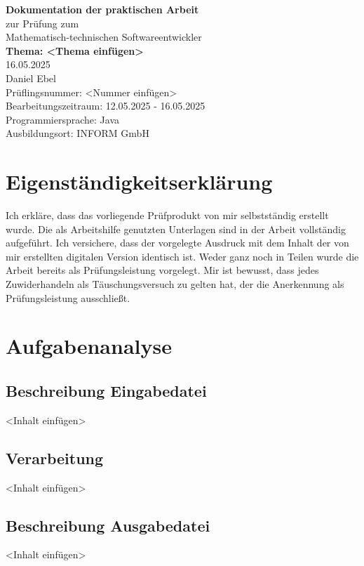 \documentclass[a4paper,12pt]{report}
\begin{document}
\begin{titlepage}
    \centering
    \vspace*{3cm}
    {\Huge \textbf{Dokumentation der praktischen Arbeit}}\\[2cm]
    {\large zur Prüfung zum \\ Mathematisch-technischen Softwareentwickler}\\[2cm]
    {\Large \textbf{Thema: <Thema einfügen>}}\\[1cm]
    {16.05.2025}\\[5cm]
    {Daniel Ebel}\\[2cm]
    Prüflingsnummer: <Nummer einfügen>\\[0.5cm]
    Bearbeitungszeitraum: 12.05.2025 - 16.05.2025\\[0.5cm]
    Programmiersprache: Java\\[0.5cm]
    Ausbildungsort: INFORM GmbH
\end{titlepage}

\chapter*{Eigenständigkeitserklärung}
Ich erkläre, dass das vorliegende Prüfprodukt von mir selbstständig erstellt wurde. Die als Arbeitshilfe genutzten Unterlagen sind in der Arbeit vollständig aufgeführt. Ich versichere, dass der vorgelegte Ausdruck mit dem Inhalt der von mir erstellten digitalen Version identisch ist. Weder ganz noch in Teilen wurde die Arbeit bereits als Prüfungsleistung vorgelegt. Mir ist bewusst, dass jedes Zuwiderhandeln als Täuschungsversuch zu gelten hat, der die Anerkennung als Prüfungsleistung ausschließt.

\tableofcontents
\listoffigures

\chapter{Aufgabenanalyse}
\section{Beschreibung Eingabedatei}
<Inhalt einfügen>

\section{Verarbeitung}
<Inhalt einfügen>

\section{Beschreibung Ausgabedatei}
<Inhalt einfügen>
\end{document}

